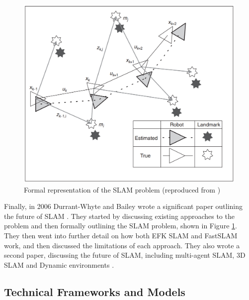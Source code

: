 \documentclass[12pt]{article}
\begin{document}
\begin{figure}[h]
    \centering
    \begin{minipage}{0.8\textwidth}
        \centering
        \includegraphics[width=\linewidth]{SLAM_problem} %
        \caption[Short caption]{Formal representation of the SLAM problem (reproduced from \cite{SLAM_summary})}
        \label{fig:SLAM_problem}
    \end{minipage}\hfill
\end{figure}

Finally, in 2006 Durrant-Whyte and Bailey wrote a significant paper outlining the future of SLAM \cite{SLAM_summary}. They started by
discussing existing approaches to the problem and then formally outlining the SLAM problem, shown in Figure \ref{fig:SLAM_problem}. They
then went into further detail on how both EFK SLAM and FastSLAM work, and then discussed the limitations of each approach. They also
wrote a second paper, discussing the future of SLAM, including multi-agent SLAM, 3D SLAM and Dynamic environments \cite{Further_SLAM}.

\subsection{Technical Frameworks and Models} %
\end{document}
